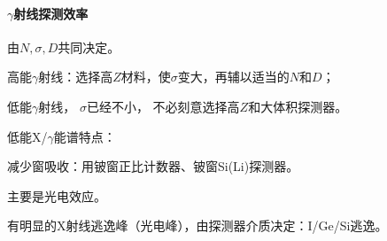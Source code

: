 \paragraph{$\gamma$射线探测效率}由$N,\sigma,D$共同决定。
\begin{compactitem}
	\item 高能$\gamma$射线：选择高$Z$材料，使$\sigma$变大，再辅以适当的$N$和$D$；
	\item 低能$\gamma$射线，%
	$\sigma$已经不小，%
	不必刻意选择高$Z$和大体积探测器。
\end{compactitem}
低能X/$\gamma$能谱特点：
\begin{compactitem}
	\item 减少窗吸收：用铍窗正比计数器、铍窗Si(Li)探测器。
	\item 主要是光电效应。
	\item 有明显的X射线逃逸峰（光电峰），由探测器介质决定：I/Ge/Si逃逸。
\end{compactitem}
